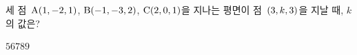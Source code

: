 세 점~$\mathrm{A}(1{,}\mkern3mu\mathopen{}-2{,}\mkern3mu\mathopen{}1)$, $\mathrm{B}(-1{,}\mkern3mu\mathopen{}-3{,}\mkern3mu\mathopen{}2)$, $\mathrm{C}(2{,}\mkern3mu\mathopen{}0{,}\mkern3mu\mathopen{}1)$을 지나는 평면이 점~$(3{,}\mkern3mu\mathopen{}k{,}\mkern3mu\mathopen{}3)$을 지날 때, $k$의 값은?
\begin{choices32}{$5$}{$6$}{$7$}{$8$}{$9$}\end{choices32}
